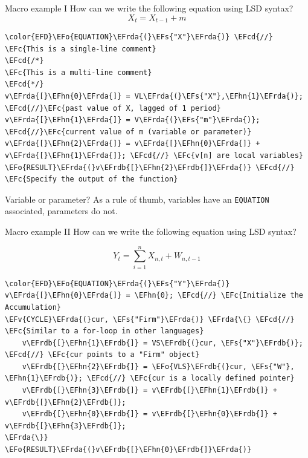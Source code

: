 \documentclass[bigger,aspectratio=169]{beamer}
\newcommand{\EFc}[1]{\textcolor{EFc}{#1}} %
\newcommand{\EFcd}[1]{\textcolor{EFcd}{#1}} %
\newcommand{\EFs}[1]{\textcolor{EFs}{#1}} %
\newcommand{\EFv}[1]{\textcolor{EFv}{#1}} %
\newcommand{\EFo}[1]{\textcolor{EFo}{#1}} %
\newcommand{\EFhn}[1]{\textcolor{EFhn}{\textbf{#1}}} %
\newcommand{\EFrda}[1]{\textcolor{EFrda}{#1}} %
\newcommand{\EFrdb}[1]{\textcolor{EFrdb}{#1}} %
\begin{document}
\begin{frame}[label={sec:orgad3ced5},fragile]{Macro example I}
 How can we write the following equation using LSD syntax?
\[X_{t} = X_{t-1} + m\]
\begin{Code}
\begin{Verbatim}
\color{EFD}\EFo{EQUATION}\EFrda{(}\EFs{"X"}\EFrda{)} \EFcd{//} \EFc{This is a single-line comment}
\EFcd{/*}
\EFc{This is a multi-line comment}
\EFcd{*/}
v\EFrda{[}\EFhn{0}\EFrda{]} = VL\EFrda{(}\EFs{"X"},\EFhn{1}\EFrda{)}; \EFcd{//}\EFc{past value of X, lagged of 1 period}
v\EFrda{[}\EFhn{1}\EFrda{]} = V\EFrda{(}\EFs{"m"}\EFrda{)}; \EFcd{//}\EFc{current value of m (variable or parameter)}
v\EFrda{[}\EFhn{2}\EFrda{]} = v\EFrda{[}\EFhn{0}\EFrda{]} + v\EFrda{[}\EFhn{1}\EFrda{]}; \EFcd{//} \EFc{v[n] are local variables}
\EFo{RESULT}\EFrda{(}v\EFrdb{[}\EFhn{2}\EFrdb{]}\EFrda{)} \EFcd{//} \EFc{Specify the output of the function}
\end{Verbatim}
\end{Code}
\begin{block}{Variable or parameter?}
As a rule of thumb, variables have an \texttt{EQUATION} associated, parameters do not.
\end{block}
\end{frame}
\begin{frame}[label={sec:org690b8e0},fragile]{Macro example II}
 How can we write the following equation using LSD syntax?

\[Y_{t} = \sum_{i=1}^{n} X_{n,t} + W_{n,t-1}\]



\begin{Code}
\begin{Verbatim}
\color{EFD}\EFo{EQUATION}\EFrda{(}\EFs{"Y"}\EFrda{)}
v\EFrda{[}\EFhn{0}\EFrda{]} = \EFhn{0}; \EFcd{//} \EFc{Initialize the Accumulation}
\EFv{CYCLE}\EFrda{(}cur, \EFs{"Firm"}\EFrda{)} \EFrda{\{} \EFcd{//} \EFc{Similar to a for-loop in other languages}
    v\EFrdb{[}\EFhn{1}\EFrdb{]} = VS\EFrdb{(}cur, \EFs{"X"}\EFrdb{)}; \EFcd{//} \EFc{cur points to a "Firm" object}
    v\EFrdb{[}\EFhn{2}\EFrdb{]} = \EFo{VLS}\EFrdb{(}cur, \EFs{"W"}, \EFhn{1}\EFrdb{)}; \EFcd{//} \EFc{cur is a locally defined pointer}
    v\EFrdb{[}\EFhn{3}\EFrdb{]} = v\EFrdb{[}\EFhn{1}\EFrdb{]} + v\EFrdb{[}\EFhn{2}\EFrdb{]};
    v\EFrdb{[}\EFhn{0}\EFrdb{]} = v\EFrdb{[}\EFhn{0}\EFrdb{]} + v\EFrdb{[}\EFhn{3}\EFrdb{]};
\EFrda{\}}
\EFo{RESULT}\EFrda{(}v\EFrdb{[}\EFhn{0}\EFrdb{]}\EFrda{)}
\end{Verbatim}
\end{Code}
\end{frame}
\end{document}
